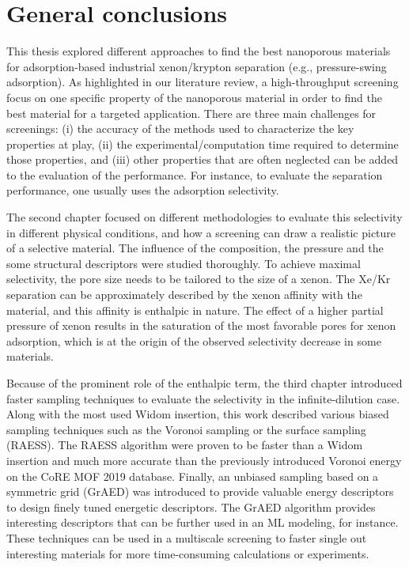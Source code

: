 
\chapter*{General conclusions}

This thesis explored different approaches to find the best nanoporous materials for adsorption-based industrial xenon/krypton separation (e.g., pressure-swing adsorption). As highlighted in our literature review,\autocite{Ren_2022} a high-throughput screening focus on one specific property of the nanoporous material in order to find the best material for a targeted application. There are three main challenges for screenings: (i) the accuracy of the methods used to characterize the key properties at play, (ii) the experimental/computation time required to determine those properties, and (iii) other properties that are often neglected can be added to the evaluation of the performance. For instance, to evaluate the separation performance, one usually uses the adsorption selectivity. 

The second chapter focused on different methodologies to evaluate this selectivity in different physical conditions, and how a screening can draw a realistic picture of a selective material.\autocite{Ren_2021} The influence of the composition, the pressure and the some structural descriptors were studied thoroughly. To achieve maximal selectivity, the pore size needs to be tailored to the size of a xenon. The Xe/Kr separation can be approximately described by the xenon affinity with the material, and this affinity is enthalpic in nature. The effect of a higher partial pressure of xenon results in the saturation of the most favorable pores for xenon adsorption, which is at the origin of the observed selectivity decrease in some materials.
 
Because of the prominent role of the enthalpic term, the third chapter introduced faster sampling techniques to evaluate the selectivity in the infinite-dilution case. Along with the most used Widom insertion, this work described various biased sampling techniques such as the Voronoi sampling or the surface sampling (RAESS). The RAESS algorithm\autocite{Ren_2023} were proven to be faster than a Widom insertion and much more accurate than the previously introduced Voronoi energy\autocite{Simon_2015} on the CoRE MOF 2019 database. Finally, an unbiased sampling based on a symmetric grid (GrAED) was introduced to provide valuable energy descriptors to design finely tuned energetic descriptors. The GrAED algorithm provides interesting descriptors that can be further used in an ML modeling, for instance.
These techniques can be used in a multiscale screening to faster single out interesting materials for more time-consuming calculations or experiments. 

